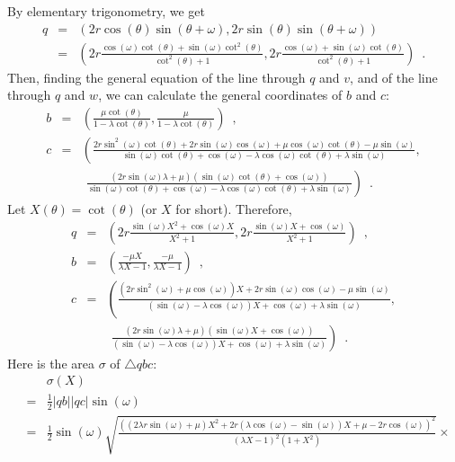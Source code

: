\documentclass[11pt, oneside]{article}
\begin{document}
\begin{enumerate}
By elementary trigonometry,
we get
\begin{eqnarray*}
q &=& (2r\cos(\theta)\sin(\theta+\omega),2r\sin(\theta)\sin(\theta+\omega))\\
  &=& \left(2r\frac{\cos(\omega)\cot(\theta)+\sin(\omega)\cot^2\!(\theta)}{\cot^2\!(\theta)+1},2r\frac{\cos(\omega)+\sin(\omega)\cot(\theta)}{\cot^2\!(\theta)+1}\right)\enspace.
\end{eqnarray*}
Then,
finding the general equation of the line through $q$ and $v$,
and of the line through $q$ and $w$,
we can calculate the general coordinates of $b$ and $c$:
\begin{eqnarray*}
b &=& \left(\frac{\mu\cot(\theta)}{1-\lambda\cot(\theta)},\frac{\mu}{1-\lambda\cot(\theta)}\right) \enspace,\\
c &=& \left(\frac{2r\sin^2\!(\omega)\cot(\theta)+2r\sin(\omega)\cos(\omega)+\mu\cos(\omega)\cot(\theta)-\mu\sin(\omega)}
{\sin(\omega)\cot(\theta)+\cos(\omega)-\lambda\cos(\omega)\cot(\theta)+\lambda\sin(\omega)}\right.,\\
&&\phantom{(}\left.\frac{(2r\sin(\omega)\lambda+\mu)(\sin(\omega)\cot(\theta)+\cos(\omega))}
{\sin(\omega)\cot(\theta)+\cos(\omega)-\lambda\cos(\omega)\cot(\theta)+\lambda\sin(\omega)}\right) \enspace.
\end{eqnarray*}
Let $X(\theta) = \cot(\theta)$
(or $X$ for short).
Therefore,
\begin{eqnarray*}
q &=& \left(2r\frac{\sin(\omega)X^2+\cos(\omega)X}{X^2+1},2r\frac{\sin(\omega)X+\cos(\omega)}{X^2+1}\right)\enspace,\\
b &=& \left(\frac{-\mu X}{\lambda X-1},\frac{-\mu}{\lambda X-1}\right) \enspace,\\
c &=& \left(\frac{(2r\sin^2\!(\omega)+\mu\cos(\omega))X+2r\sin(\omega)\cos(\omega)-\mu\sin(\omega)}
{(\sin(\omega)-\lambda\cos(\omega))X+\cos(\omega)+\lambda\sin(\omega)}\right.,\\
&&\phantom{(}\left.\frac{(2r\sin(\omega)\lambda+\mu)(\sin(\omega)X+\cos(\omega))}
{(\sin(\omega)-\lambda\cos(\omega))X+\cos(\omega)+\lambda\sin(\omega)}\right) \enspace.
\end{eqnarray*}
Here is the area $\sigma$ of $\triangle qbc$:
\begin{eqnarray*}
&& \sigma(X)\\
&=& \frac{1}{2}|qb||qc|\sin(\omega)\\
&=& \frac{1}{2}\sin(\omega)\sqrt{\frac{((2\lambda r\sin(\omega)+\mu)X^2+2r(\lambda\cos(\omega)-\sin(\omega))X+\mu-2r\cos(\omega))^2}{(\lambda X-1)^2(1+X^2)}}\times\\

\end{eqnarray*}
\end{enumerate}
\end{document}
